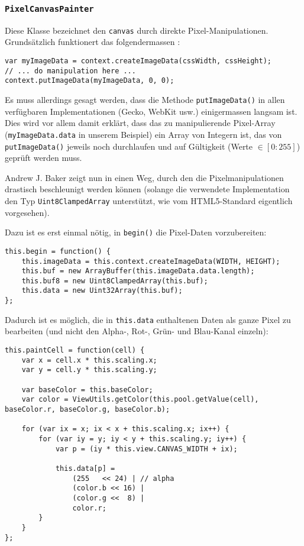 \documentclass[11pt]{scrreprt} %
\theoremstyle{definition}
\begin{document}
\subsubsection{{\tt PixelCanvasPainter}}

Diese Klasse bezeichnet den {\tt canvas} durch direkte Pixel-Manipulationen. Grundsätzlich funktionert das folgendermassen \cite{mdn:PixelCanvasDoku}:

\begin{lstlisting}
var myImageData = context.createImageData(cssWidth, cssHeight);
// ... do manipulation here ...
context.putImageData(myImageData, 0, 0);
\end{lstlisting}

Es muss allerdings gesagt werden, dass die Methode {\tt putImageData()} in allen verfügbaren Implementationen (Gecko, WebKit usw.) einigermassen langsam ist. Dies wird vor allem damit erklärt, dass das zu manipulierende Pixel-Array ({\tt myImageData.data} in unserem Beispiel) ein Array von Integern ist, das von {\tt putImageData()} jeweils noch durchlaufen und auf Gültigkeit (Werte $\in [0: 255]$) geprüft werden muss.

Andrew J. Baker zeigt nun in \cite{mdn:PixelCanvas} einen Weg, durch den die Pixelmanipulationen drastisch beschleunigt werden können (solange die verwendete Implementation den Typ {\tt Uint8ClampedArray} unterstützt, wie vom HTML5-Standard  \cite{wthree:twodcanvas} eigentlich vorgesehen).

Dazu ist es erst einmal nötig, in {\tt begin()} die Pixel-Daten vorzubereiten:

\begin{lstlisting}
this.begin = function() {
	this.imageData = this.context.createImageData(WIDTH, HEIGHT);
	this.buf = new ArrayBuffer(this.imageData.data.length);
	this.buf8 = new Uint8ClampedArray(this.buf);
	this.data = new Uint32Array(this.buf);
};
\end{lstlisting}

Dadurch ist es möglich, die in {\tt this.data} enthaltenen Daten als ganze Pixel zu bearbeiten (und nicht den Alpha-, Rot-, Grün- und Blau-Kanal einzeln):

\begin{lstlisting}
this.paintCell = function(cell) {
	var x = cell.x * this.scaling.x;
	var y = cell.y * this.scaling.y;
	
	var baseColor = this.baseColor;
	var color = ViewUtils.getColor(this.pool.getValue(cell), baseColor.r, baseColor.g, baseColor.b);
		
	for (var ix = x; ix < x + this.scaling.x; ix++) {
		for (var iy = y; iy < y + this.scaling.y; iy++) {
			var p = (iy * this.view.CANVAS_WIDTH + ix);
			
			this.data[p] =
				(255   << 24) | // alpha
				(color.b << 16) |
				(color.g <<  8) |
				color.r;
		}
	}
};
\end{lstlisting}
\end{document}
